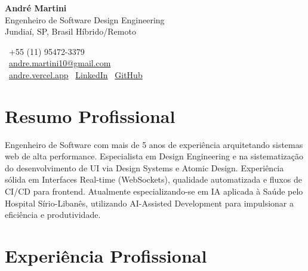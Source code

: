 \documentclass[10pt,a4paper]{article}
\begin{document}
\noindent
\begin{minipage}[t]{0.6\textwidth}
  {\Huge \textbf{André Martini}} \\
  \vspace{4pt}
  {\large\color{darkgray} Engenheiro de Software \textbar{} Design Engineering} \\
  \vspace{2pt}
  {\color{gray} Jundiaí, SP, Brasil \textbar{} Híbrido/Remoto}
\end{minipage}%
\begin{minipage}[t]{0.4\textwidth}
  \raggedleft
  \small
  \faPhone*~+55 (11) 95472-3379 \\
  \vspace{2pt}
  \faEnvelope~\href{mailto:andre.martini10@gmail.com}{andre.martini10@gmail.com} \\
  \vspace{2pt}
  \faGlobe~\href{https://andre.vercel.app}{andre.vercel.app} \textbar{}
  \faLinkedin~\href{https://www.linkedin.com/in/martiniandre}{LinkedIn} \textbar{}
  \faGithub~\href{https://github.com/martiniandre}{GitHub}
\end{minipage}

\vspace{10pt}

\section{Resumo Profissional}
Engenheiro de Software com mais de 5 anos de experiência arquitetando sistemas web de alta performance. Especialista em Design Engineering e na sistematização do desenvolvimento de UI via Design Systems e Atomic Design. Experiência sólida em Interfaces Real-time (WebSockets), qualidade automatizada e fluxos de CI/CD para frontend. Atualmente especializando-se em IA aplicada à Saúde pelo Hospital Sírio-Libanês, utilizando AI-Assisted Development para impulsionar a eficiência e produtividade.

\section{Experiência Profissional}
\end{document}
